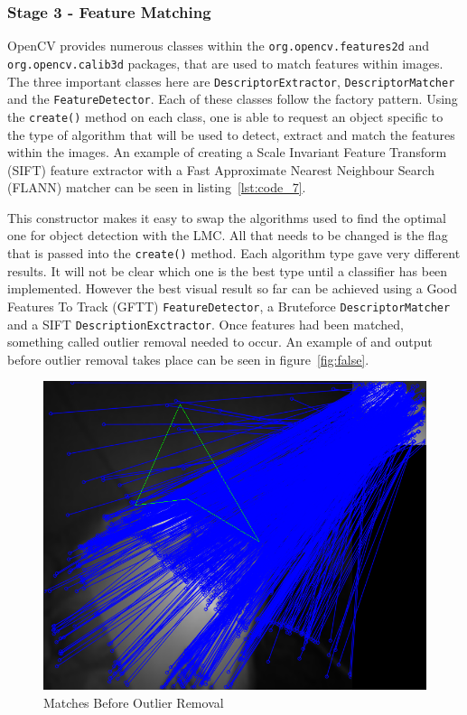 \documentclass[11pt,oneside]{report}
\newcommand\code[1]{\texttt{#1}}
\begin{document}
		\subsubsection{Stage 3 - Feature Matching}
			OpenCV provides numerous classes within the \code{org.opencv.features2d} and \code{org.opencv.calib3d} packages, that are used to match features within images.
			The three important classes here are \code{DescriptorExtractor}, \code{DescriptorMatcher} and the \code{FeatureDetector}.
			Each of these classes follow the factory pattern.
			Using the \code{create()} method on each class, one is able to request an object specific to the type of algorithm that will be used to detect, extract and match the features within the images.
			An example of creating a Scale Invariant Feature Transform (SIFT) feature extractor with a Fast Approximate Nearest Neighbour Search (FLANN) matcher can be seen in listing~\ref{lst:code_7}.
			
			This constructor makes it easy to swap the algorithms used to find the optimal one for object detection with the LMC.
			All that needs to be changed is the flag that is passed into the \code{create()} method.
			Each algorithm type gave very different results.
			It will not be clear which one is the best type until a classifier has been implemented.
			However the best visual result so far can be achieved using a Good Features To Track (GFTT) \code{FeatureDetector}, a Bruteforce \code{DescriptorMatcher} and a SIFT \code{DescriptionExctractor}.
			Once features had been matched, something called outlier removal needed to occur.
			An example of and output before outlier removal takes place can be seen in figure~\ref{fig:false}.
			
			\begin{figure}
			\centering
    				\includegraphics[width=\textwidth]{false}
    			\caption{Matches Before Outlier Removal \protect {\label{fig:false}}}

			\end{figure}				
			
\end{document}
